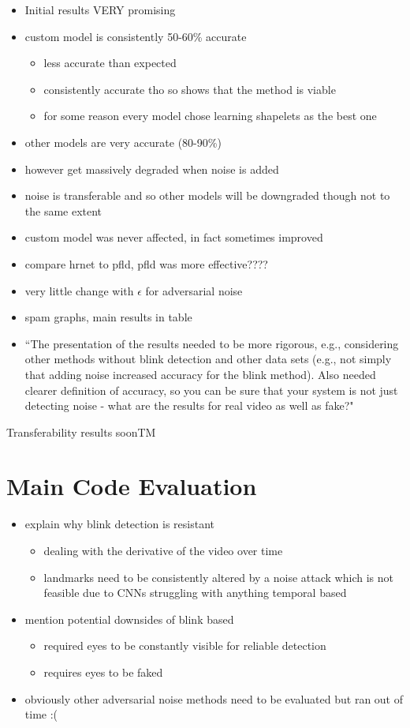\begin{itemize}
    \item Initial results VERY promising
    \item custom model is consistently 50-60\% accurate
    \begin{itemize}
        \item less accurate than expected
        \item consistently accurate tho so shows that the method is viable
        \item for some reason every model chose learning shapelets as the best one
    \end{itemize}
    \item other models are very accurate (80-90\%)
    \item however get massively degraded when noise is added
    \item noise is transferable and so other models will be downgraded though not to the same extent
    \item custom model was never affected, in fact sometimes improved
    \item compare hrnet to pfld, pfld was more effective????
    \item very little change with $\epsilon$ for adversarial noise
    \item spam graphs, main results in table
    \item ``The presentation of the results needed to be more rigorous, e.g., considering other methods without blink detection and other data sets (e.g., not simply that adding noise increased accuracy for the blink method). Also needed clearer definition of accuracy, so you can be sure that your system is not just detecting noise - what are the results for real video as well as fake?"
\end{itemize}

Transferability results soonTM

\section{Main Code Evaluation}

\begin{itemize}
    \item explain why blink detection is resistant
    \begin{itemize}
        \item dealing with the derivative of the video over time
        \item landmarks need to be consistently altered by a noise attack which is not feasible due to CNNs struggling with anything temporal based
    \end{itemize}
    \item mention potential downsides of blink based
    \begin{itemize}
        \item required eyes to be constantly visible for reliable detection
        \item requires eyes to be faked
    \end{itemize}
    \item obviously other adversarial noise methods need to be evaluated but ran out of time :(
\end{itemize}